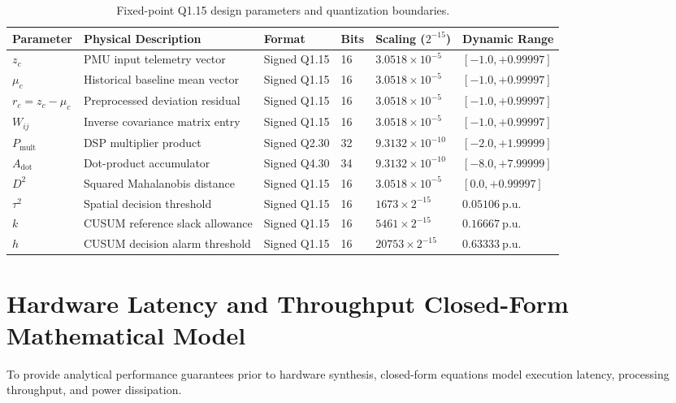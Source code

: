 \documentclass[11pt,a4paper]{report}
\begin{document}
\begin{table}[H]
\centering
\caption{Fixed-point Q1.15 design parameters and quantization boundaries.}
\label{tab:q15_params}
\small
\renewcommand{\arraystretch}{1.25}
\begin{tabular}{|p{2.6cm}|p{4.2cm}|p{2.0cm}|p{1.4cm}|p{2.4cm}|p{2.4cm}|}
\hline
\textbf{Parameter} & \textbf{Physical Description} & \textbf{Format} & \textbf{Bits} & \textbf{Scaling ($2^{-15}$)} & \textbf{Dynamic Range} \\
\hline
$z_c$ & PMU input telemetry vector & Signed Q1.15 & 16 & $3.0518 \times 10^{-5}$ & $[-1.0, +0.99997]$ \\
\hline
$\mu_c$ & Historical baseline mean vector & Signed Q1.15 & 16 & $3.0518 \times 10^{-5}$ & $[-1.0, +0.99997]$ \\
\hline
$r_c = z_c - \mu_c$ & Preprocessed deviation residual & Signed Q1.15 & 16 & $3.0518 \times 10^{-5}$ & $[-1.0, +0.99997]$ \\
\hline
$W_{ij}$ & Inverse covariance matrix entry & Signed Q1.15 & 16 & $3.0518 \times 10^{-5}$ & $[-1.0, +0.99997]$ \\
\hline
$P_{\text{mult}}$ & DSP multiplier product & Signed Q2.30 & 32 & $9.3132 \times 10^{-10}$ & $[-2.0, +1.99999]$ \\
\hline
$A_{\text{dot}}$ & Dot-product accumulator & Signed Q4.30 & 34 & $9.3132 \times 10^{-10}$ & $[-8.0, +7.99999]$ \\
\hline
$D^2$ & Squared Mahalanobis distance & Signed Q1.15 & 16 & $3.0518 \times 10^{-5}$ & $[0.0, +0.99997]$ \\
\hline
$\tau^2$ & Spatial decision threshold & Signed Q1.15 & 16 & $1673 \times 2^{-15}$ & $0.05106~\text{p.u.}$ \\
\hline
$k$ & CUSUM reference slack allowance & Signed Q1.15 & 16 & $5461 \times 2^{-15}$ & $0.16667~\text{p.u.}$ \\
\hline
$h$ & CUSUM decision alarm threshold & Signed Q1.15 & 16 & $20753 \times 2^{-15}$ & $0.63333~\text{p.u.}$ \\
\hline
\end{tabular}
\end{table}

\section{Hardware Latency and Throughput Closed-Form Mathematical Model}
To provide analytical performance guarantees prior to hardware synthesis, closed-form
equations model execution latency, processing throughput, and power dissipation.
\end{document}
